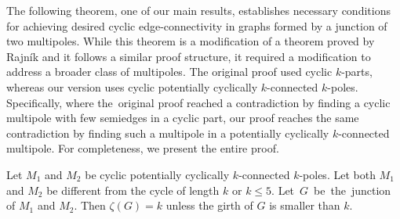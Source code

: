 \documentclass[12pt, twoside]{book}
\begin{document}
The following theorem, one of our main results, establishes necessary conditions for achieving desired cyclic edge-connectivity in graphs formed by a junction of two multipoles. While this theorem is a modification of a theorem proved by Rajník \mbox{\cite[Theorem 5.2]{Rajnik_phd}} and it follows a similar proof structure, it required a modification to address a broader class of multipoles. The original proof used cyclic $k$-parts, whereas our version uses cyclic potentially cyclically $k$-connected $k$-poles. Specifically, where the~original proof reached a contradiction by finding a cyclic multipole with few semiedges in a cyclic part, our proof reaches the same contradiction by finding such a multipole in a potentially cyclically $k$-connected multipole. For completeness, we present the entire proof.

\begin{theorem}\label{th:junction-of-kpoles-cyclic-edge-connectivity}
	Let $M_1$ and $M_2$ be cyclic potentially cyclically $k$-connected $k$-poles. Let both $M_1$ and $M_2$ be different from the cycle of length $k$ or $k\leq 5$. \mbox{Let $G$ be the junction} of $M_1$ and $M_2$. Then $\zeta(G)=k$ unless the girth of $G$ is smaller than $k$.
\end{theorem}
\end{document}
